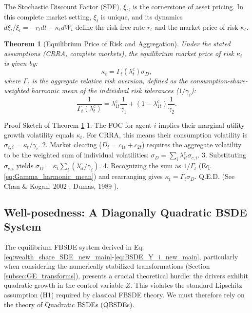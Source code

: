 \documentclass[11pt,letterpaper,oneside]{article}
\theoremstyle{plain}
\newtheorem{theorem}{Theorem}[section]
\theoremstyle{definition}
\theoremstyle{remark}
\begin{document}
The Stochastic Discount Factor (SDF), $\xi_t$, is the cornerstone of asset pricing. In this complete market setting, $\xi_t$ is unique, and its dynamics $d\xi_t/\xi_t = -r_t dt - \kappa_t dW_t$ define the risk-free rate $r_t$ and the market price of risk $\kappa_t$.

\begin{theorem}[Equilibrium Price of Risk and Aggregation]
\label{thm:price_of_risk_aggregation}
Under the stated assumptions (CRRA, complete markets), the equilibrium market price of risk $\kappa_t$ is given by:
\begin{equation}\label{eq:kappa_aggregation}
    \kappa_t = \Gamma_t(\lambda^c_t) \sigma_D,
\end{equation}
where $\Gamma_t$ is the aggregate relative risk aversion, defined as the consumption-share-weighted harmonic mean of the individual risk tolerances ($1/\gamma_i$):
\begin{equation}\label{eq:Gamma_harmonic_mean}
    \frac{1}{\Gamma_t(\lambda^c_t)} = \lambda^c_{1t}\frac{1}{\gamma_1} + (1-\lambda^c_{1t})\frac{1}{\gamma_2}.
\end{equation}
\end{theorem}

\begin{leanproofbox}{Proof Sketch of Theorem \ref{thm:price_of_risk_aggregation}}
1. The FOC for agent $i$ implies their marginal utility growth volatility equals $\kappa_t$. For CRRA, this means their consumption volatility is $\sigma_{c,i} = \kappa_t/\gamma_i$.
2. Market clearing ($D_t = c_{1t}+c_{2t}$) requires the aggregate volatility to be the weighted sum of individual volatilities: $\sigma_D = \sum_i \lambda^c_{it} \sigma_{c,i}$.
3. Substituting $\sigma_{c,i}$ yields $\sigma_D = \kappa_t \sum_i (\lambda^c_{it}/\gamma_i)$.
4. Recognizing the sum as $1/\Gamma_t$ (Eq. \ref{eq:Gamma_harmonic_mean}) and rearranging gives $\kappa_t = \Gamma_t \sigma_D$. Q.E.D. (See Chan \& Kogan, 2002 \cite{ChanKogan2002}; Dumas, 1989 \cite{Dumas1989}).
\end{leanproofbox}

\subsection{Well-posedness: A Diagonally Quadratic BSDE System}
\label{subsubsec:GE_QBSDE_Wellposedness}

The equilibrium FBSDE system derived in Eq. \eqref{eq:wealth_share_SDE_new_main}-\eqref{eq:BSDE_Y_i_new_main}, particularly when considering the numerically stabilized transformations (Section \ref{subsec:GE_transforms}), presents a crucial theoretical hurdle: the drivers exhibit quadratic growth in the control variable $Z$. This violates the standard Lipschitz assumption (H1) required by classical FBSDE theory. We must therefore rely on the theory of Quadratic BSDEs (QBSDEs).
\end{document}
